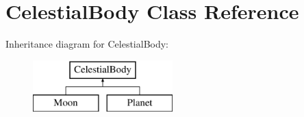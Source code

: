 \hypertarget{classCelestialBody}{
\section{CelestialBody Class Reference}
\label{d4/d0b/classCelestialBody}
}
Inheritance diagram for CelestialBody:\begin{figure}[H]
\begin{center}
\leavevmode
\includegraphics[height=2cm]{d4/d0b/classCelestialBody}
\end{center}
\end{figure}
